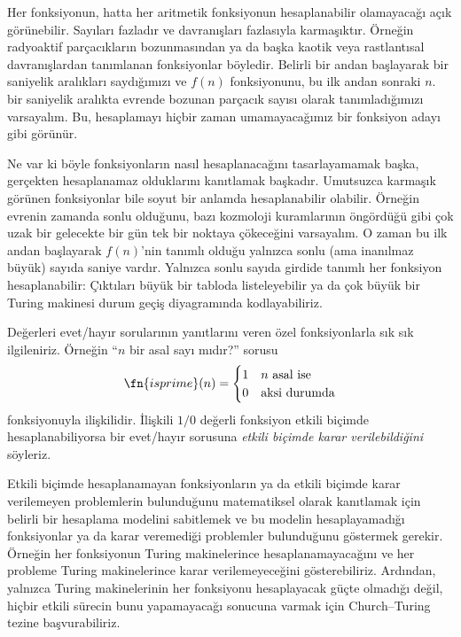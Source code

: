 


Her fonksiyonun, hatta her aritmetik fonksiyonun hesaplanabilir olamayacağı
açık görünebilir. Sayıları fazladır ve davranışları fazlasıyla karmaşıktır.
Örneğin radyoaktif parçacıkların bozunmasından ya da başka kaotik veya
rastlantısal davranışlardan tanımlanan fonksiyonlar böyledir. Belirli bir
andan başlayarak bir saniyelik aralıkları saydığımızı ve $f(n)$ fonksiyonunu,
bu ilk andan sonraki $n$. bir saniyelik aralıkta evrende bozunan parçacık
sayısı olarak tanımladığımızı varsayalım. Bu, hesaplamayı hiçbir zaman
umamayacağımız bir fonksiyon adayı gibi görünür.

Ne var ki böyle fonksiyonların nasıl hesaplanacağını tasarlayamamak başka,
gerçekten hesaplanamaz olduklarını kanıtlamak başkadır. Umutsuzca karmaşık
görünen fonksiyonlar bile soyut bir anlamda hesaplanabilir olabilir. Örneğin
evrenin zamanda sonlu olduğunu, bazı kozmoloji kuramlarının öngördüğü gibi çok
uzak bir gelecekte bir gün tek bir noktaya çökeceğini varsayalım. O zaman bu
ilk andan başlayarak $f(n)$'nin tanımlı olduğu yalnızca sonlu (ama inanılmaz
büyük) sayıda saniye vardır. Yalnızca sonlu sayıda girdide tanımlı her
fonksiyon hesaplanabilir: Çıktıları büyük bir tabloda listeleyebilir ya da çok
büyük bir Turing makinesi durum geçiş diyagramında kodlayabiliriz.

Değerleri evet/hayır sorularının yanıtlarını veren özel fonksiyonlarla sık
sık ilgileniriz. Örneğin ``$n$ bir asal sayı mıdır?'' sorusu
\[
\fn{isprime}(n) = \begin{cases}
  1 & \text{$n$ asal ise}\\
  0 & \text{aksi durumda}
  \end{cases}
\]
fonksiyonuyla ilişkilidir. İlişkili $1/0$ değerli fonksiyon etkili biçimde
hesaplanabiliyorsa bir evet/hayır sorusuna \emph{etkili biçimde karar
verilebildiğini} söyleriz.

Etkili biçimde hesaplanamayan fonksiyonların ya da etkili biçimde karar
verilemeyen problemlerin bulunduğunu matematiksel olarak kanıtlamak için
belirli bir hesaplama modelini sabitlemek ve bu modelin hesaplayamadığı
fonksiyonlar ya da karar veremediği problemler bulunduğunu göstermek gerekir.
Örneğin her fonksiyonun Turing makinelerince hesaplanamayacağını ve her
probleme Turing makinelerince karar verilemeyeceğini gösterebiliriz. Ardından,
yalnızca Turing makinelerinin her fonksiyonu hesaplayacak güçte olmadığı değil,
hiçbir etkili sürecin bunu yapamayacağı sonucuna varmak için Church--Turing
tezine başvurabiliriz.

